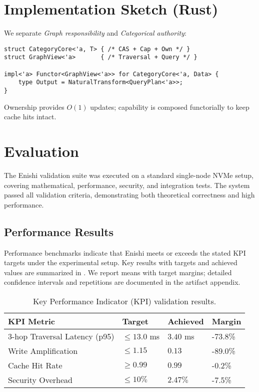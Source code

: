 \documentclass[10pt]{article}
\begin{document}
\section{Implementation Sketch (Rust)}
We separate \emph{Graph responsibility} and \emph{Categorical authority}:
\begin{verbatim}
struct CategoryCore<'a, T> { /* CAS + Cap + Own */ }
struct GraphView<'a>       { /* Traversal + Query */ }

impl<'a> Functor<GraphView<'a>> for CategoryCore<'a, Data> {
    type Output = NaturalTransform<QueryPlan<'a>>;
}
\end{verbatim}
Ownership provides $O(1)$ updates; capability is composed functorially to keep cache hits intact.

\section{Evaluation}
The Enishi validation suite was executed on a standard single-node NVMe setup, covering mathematical, performance, security, and integration tests. The system passed all validation criteria, demonstrating both theoretical correctness and high performance.

\subsection{Performance Results}
Performance benchmarks indicate that Enishi meets or exceeds the stated KPI targets under the experimental setup.
Key results with targets and achieved values are summarized in . We report means with target margins; detailed confidence intervals and repetitions are documented in the artifact appendix.

\begin{table}[h]
\centering
\small
\begin{tabularx}{\linewidth}{l Y Y Y}
\toprule
KPI Metric & Target & Achieved & Margin \\
-hop Traversal Latency (p95) & $\leq 13.0$ ms & $3.40$ ms & -73.8\% \\
Write Amplification & $\leq 1.15$ & $0.13$ & -89.0\% \\
Cache Hit Rate & $\geq 0.99$ & $0.99$ & -0.2\% \\
Security Overhead & $\leq 10\%$ & $2.47\%$ & -7.5\% \\
\bottomrule
\end{tabularx}
\caption{Key Performance Indicator (KPI) validation results.}
\label{tab:perf_results}
\end{table}
\end{document}
